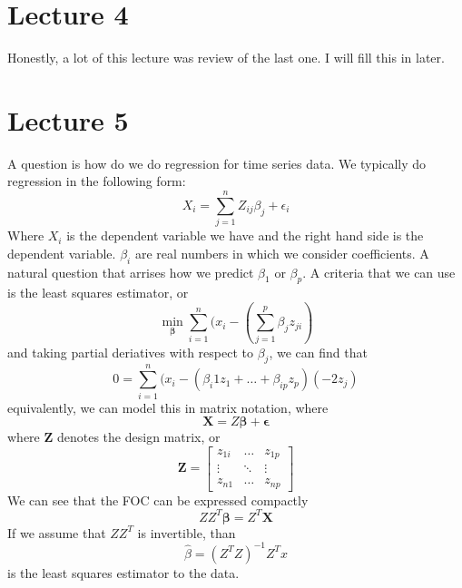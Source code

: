 \documentclass[12pt]{article}
\begin{document}
\section{Lecture 4}
Honestly, a lot of this lecture was review of the last one. I will fill this in later. 
\section{Lecture 5}
A question is how do we do regression for time series data. We typically do regression in the following form:
\[
	X_i = \sum_{j = 1}^n Z_{ij} \beta_j + \epsilon_i 
\]
Where $X_i$ is the dependent variable we have and the right hand side is the dependent variable. $\beta_i$ are real numbers in which we consider coefficients. A natural question that arrises how we predict $\beta_1$ or $\beta_p$. A criteria that we can use is the least squares estimator, or 
\[
	\min_{\mathbf{\beta}} \sum_{i = 1}^n (x_i - (\sum_{j = 1}^p \beta_j z_{ji})
\]
and taking partial deriatives with respect to $\beta_j$, we can find that 
\[
	0 = \sum_{i = 1}^n (x_i - (\beta_i1 z_1 + \dots + \beta_{ip}z_p)(-2z_j)
\]
equivalently, we can model this in matrix notation, where 
\[
	\mathbf{X} = Z\mathbf{\beta} + \mathbf{\epsilon}
\]
where $\mathbf{Z}$ denotes the design matrix, or 
\[
	\mathbf{Z} = \begin{bmatrix}
		z_{1i} & \dots & z_{1p} \\ 
		\vdots & \ddots & \vdots \\ 
		z_{n1} & \dots & z_{np} 
	\end{bmatrix}
\]
We can see that the FOC can be expressed compactly 
\[
	ZZ^T \mathbf{\beta} = Z^T \mathbf{X}
\]
If we assume that $ZZ^T$ is invertible, than 
\[
	\hat{\beta} = (Z^TZ)^{-1}Z^Tx 
\]
is the least squares estimator to the data. 
\end{document}

